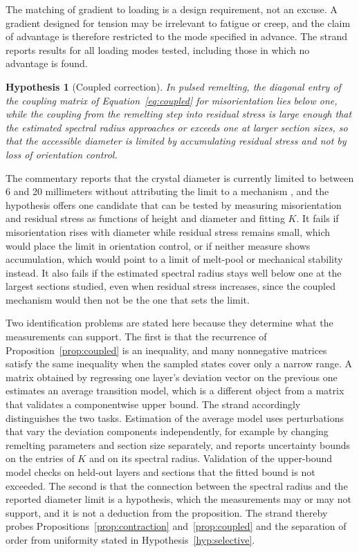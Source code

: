 \documentclass[11pt]{article}
\newtheorem{hypothesis}{Hypothesis}
\theoremstyle{definition}
\begin{document}
The matching of gradient to loading is a design requirement, not an excuse. A gradient designed for tension may be irrelevant to fatigue or creep, and the claim of advantage is therefore restricted to the mode specified in advance. The strand reports results for all loading modes tested, including those in which no advantage is found.

\begin{hypothesis}[Coupled correction]
\label{hyp:coupled}
In pulsed remelting, the diagonal entry of the coupling matrix of Equation~\eqref{eq:coupled} for misorientation lies below one, while the coupling from the remelting step into residual stress is large enough that the estimated spectral radius approaches or exceeds one at larger section sizes, so that the accessible diameter is limited by accumulating residual stress and not by loss of orientation control.
\end{hypothesis}

The commentary reports that the crystal diameter is currently limited to between 6 and 20 millimeters without attributing the limit to a mechanism \cite{rohrer2026}, and the hypothesis offers one candidate that can be tested by measuring misorientation and residual stress as functions of height and diameter and fitting $K$. It fails if misorientation rises with diameter while residual stress remains small, which would place the limit in orientation control, or if neither measure shows accumulation, which would point to a limit of melt-pool or mechanical stability instead. It also fails if the estimated spectral radius stays well below one at the largest sections studied, even when residual stress increases, since the coupled mechanism would then not be the one that sets the limit.

Two identification problems are stated here because they determine what the measurements can support. The first is that the recurrence of Proposition~\ref{prop:coupled} is an inequality, and many nonnegative matrices satisfy the same inequality when the sampled states cover only a narrow range. A matrix obtained by regressing one layer's deviation vector on the previous one estimates an average transition model, which is a different object from a matrix that validates a componentwise upper bound. The strand accordingly distinguishes the two tasks. Estimation of the average model uses perturbations that vary the deviation components independently, for example by changing remelting parameters and section size separately, and reports uncertainty bounds on the entries of $K$ and on its spectral radius. Validation of the upper-bound model checks on held-out layers and sections that the fitted bound is not exceeded. The second is that the connection between the spectral radius and the reported diameter limit is a hypothesis, which the measurements may or may not support, and it is not a deduction from the proposition. The strand thereby probes Propositions~\ref{prop:contraction} and~\ref{prop:coupled} and the separation of order from uniformity stated in Hypothesis~\ref{hyp:selective}.
\end{document}
